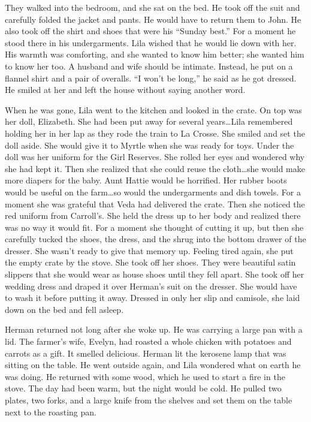 \documentclass[
  american,
  letterpaper,
]{book}
\begin{document}
They walked into the bedroom, and she sat on the bed. He took off the
suit and carefully folded the jacket and pants. He would have to return
them to John. He also took off the shirt and shoes that were his
``Sunday best.'' For a moment he stood there in his undergarments. Lila
wished that he would lie down with her. His warmth was comforting, and
she wanted to know him better; she wanted him to know her too. A husband
and wife should be intimate. Instead, he put on a flannel shirt and a
pair of overalls. ``I won't be long,'' he said as he got dressed. He
smiled at her and left the house without saying another word.

When he was gone, Lila went to the kitchen and looked in the crate. On
top was her doll, Elizabeth. She had been put away for several
years\ldots Lila remembered holding her in her lap as they rode the
train to La Crosse. She smiled and set the doll aside. She would give it
to Myrtle when she was ready for toys. Under the doll was her uniform
for the Girl Reserves. She rolled her eyes and wondered why she had kept
it. Then she realized that she could reuse the cloth\ldots she would
make more diapers for the baby. Aunt Hattie would be horrified. Her
rubber boots would be useful on the farm\ldots so would the
undergarments and dish towels. For a moment she was grateful that Veda
had delivered the crate. Then she noticed the red uniform from
Carroll's. She held the dress up to her body and realized there was no
way it would fit. For a moment she thought of cutting it up, but then
she carefully tucked the shoes, the dress, and the shrug into the bottom
drawer of the dresser. She wasn't ready to give that memory up. Feeling
tired again, she put the empty crate by the stove. She took off her
shoes. They were beautiful satin slippers that she would wear as house
shoes until they fell apart. She took off her wedding dress and draped
it over Herman's suit on the dresser. She would have to wash it before
putting it away. Dressed in only her slip and camisole, she laid down on
the bed and fell asleep.

Herman returned not long after she woke up. He was carrying a large pan
with a lid. The farmer's wife, Evelyn, had roasted a whole chicken with
potatoes and carrots as a gift. It smelled delicious. Herman lit the
kerosene lamp that was sitting on the table. He went outside again, and
Lila wondered what on earth he was doing. He returned with some wood,
which he used to start a fire in the stove. The day had been warm, but
the night would be cold. He pulled two plates, two forks, and a large
knife from the shelves and set them on the table next to the roasting
pan.
\end{document}
